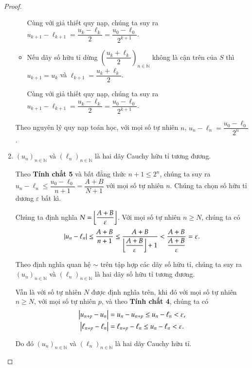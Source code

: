 \begin{proof}
\begin{enumerate}[label={\textbf{Tính chất \arabic*.}},itemindent=1.7cm]
\begin{itemize}
                        Cùng với giả thiết quy nạp, chúng ta suy ra $u_{k+1} - \ell_{k+1} = \dfrac{u_{k} - \ell_{k}}{2} = \dfrac{u_{0} - \ell_{0}}{2^{k+1}}$.
                  \item Nếu dãy số hữu tỉ dừng ${\left(\dfrac{u_{k}+\ell_{k}}{2}\right)}_{n\in\mathbb{N}}$ không là cận trên của $S$ thì $u_{k+1} = u_{k}$ và $\ell_{k+1} = \dfrac{u_{k} + \ell_{k}}{2}$.

                        Cùng với giả thiết quy nạp, chúng ta suy ra $u_{k+1} - \ell_{k+1} = \dfrac{u_{k} - \ell_{k}}{2} = \dfrac{u_{0} - \ell_{0}}{2^{k+1}}$.
              \end{itemize}

              Theo nguyên lý quy nạp toán học, với mọi số tự nhiên $n$, $u_{n} - \ell_{n} = \dfrac{u_{0} - \ell_{0}}{2^{n}}$.
        \item ${(u_{n})}_{n\in\mathbb{N}}$ và ${(\ell_{n})}_{n\in\mathbb{N}}$ là hai dãy Cauchy hữu tỉ tương đương.

              Theo \textbf{Tính chất 5} và bất đẳng thức $n+1\leq 2^{n}$, chúng ta suy ra $u_{n} - \ell_{n}\leq \dfrac{u_{0} - \ell_{0}}{n+1} = \dfrac{A+B}{N+1}$ với mọi số tự nhiên $n$. Chúng ta chọn số hữu tỉ dương $\varepsilon$ bất kì.

              Chúng ta định nghĩa $N = \left\lfloor{\dfrac{A+B}{\varepsilon}}\right\rfloor$. Với mọi số tự nhiên $n\geq N$, chúng ta có
              \[
                  \left\vert{u_{n} - \ell_{n}}\right\vert\leq \frac{A + B}{n+1}\leq \frac{A+B}{\left\lfloor{\dfrac{A+B}{\varepsilon}}\right\rfloor + 1} < \frac{A+B}{\dfrac{A+B}{\varepsilon}} = \varepsilon.
              \]

              Theo định nghĩa quan hệ $\sim$ trên tập hợp các dãy số hữu tỉ, chúng ta suy ra ${(u_{n})}_{n\in\mathbb{N}}$ và ${(\ell_{n})}_{n\in\mathbb{N}}$ là hai dãy số hữu tỉ tương đương.

              Vẫn là với số tự nhiên $N$ được định nghĩa trên, khi đó với mọi số tự nhiên $n\geq N$, với mọi số tự nhiên $p$, và theo \textbf{Tính chất 4}, chúng ta có
              \begin{align*}
                  \left\vert{u_{n+p} - u_{n}}\right\vert       & = u_{n} - u_{n+p}\leq u_{n} - \ell_{n} < \varepsilon,       \\
                  \left\vert{\ell_{n+p} - \ell_{n}}\right\vert & = \ell_{n+p} - \ell_{n}\leq u_{n} - \ell_{n} < \varepsilon.
              \end{align*}

              Do đó ${(u_{n})}_{n\in\mathbb{N}}$ và ${(\ell_{n})}_{n\in\mathbb{N}}$ là hai dãy Cauchy hữu tỉ.


\end{enumerate}
\end{proof}
